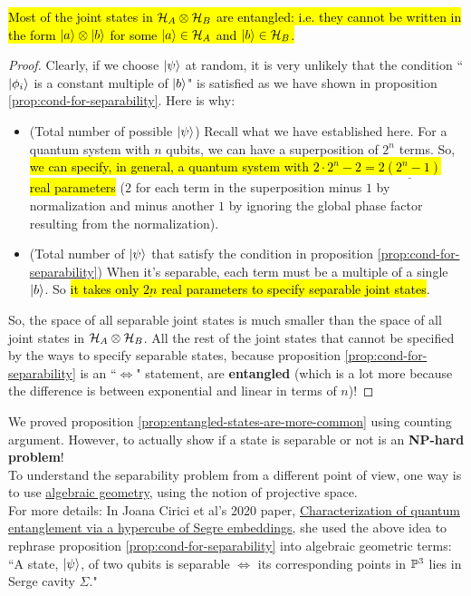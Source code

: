 \documentclass[12pt]{article}
\begin{document}
\begin{proposition}\label{prop:entangled-states-are-more-common}
\hl{Most of the joint states in $\HHH_A\otimes \HHH_B$ are entangled: i.e. they cannot be written in the form $\Ket{a}\otimes \Ket{b}$ for some $\Ket{a}\in \HHH_A$ and $\Ket{b}\in \HHH_B$. }
\end{proposition}
\begin{proof}
Clearly, if we choose $\Ket{\psi}$ at random, it is very unlikely that the condition ``$\Ket{\phi_i}$ is a constant multiple of $\Ket{b}$" is satisfied as we have shown in proposition \ref{prop:cond-for-separability}. Here is why:
\begin{itemize}
    \item (Total number of possible $\Ket{\psi}$) Recall what we have established here. For a quantum system with $n$ qubits, we can have a superposition of $2^n$ terms. So, \hl{we can specify, in general, a quantum system with $2\cdot 2^n - 2 = \underline{2(2^n - 1)}$ real parameters} ($2$ for each term in the superposition minus $1$ by normalization and minus another $1$ by ignoring the global phase factor resulting from the normalization).
    \item (Total number of $\Ket{\psi}$ that satisfy the condition in proposition \ref{prop:cond-for-separability}) When it's separable, each term must be a multiple of a single $\Ket{b}$. So \hl{it takes only $\underline{2n}$ real parameters to specify separable joint states}.
\end{itemize}

\noindent So, the space of all separable joint states is much smaller than the space of all joint states in $\HHH_A\otimes \HHH_B$. All the rest of the joint states that cannot be specified by the ways to specify separable states, because proposition \ref{prop:cond-for-separability} is an ``$\iff$" statement, are \textbf{entangled} (which is a lot more because the difference is between exponential and linear in terms of $n$)!
\end{proof}

\begin{remark}
We proved proposition \ref{prop:entangled-states-are-more-common} using counting argument. However, to actually show if a state is separable or not is an \textbf{NP-hard problem}!\\

\noindent To understand the separability problem from a different point of view, one way is to use \underline{algebraic geometry}, using the notion of projective space.\\

\noindent For more details: In Joana Cirici et al's 2020 paper, \href{https://arxiv.org/pdf/2008.09583.pdf}{Characterization of quantum entanglement via a hypercube of Segre embeddings}, she used the above idea to rephrase proposition \ref{prop:cond-for-separability} into algebraic geometric terms: ``A state, $\Ket{\psi}$, of two qubits is separable $\iff$ its corresponding points in $\PP^3$ lies in Serge cavity $\Sigma$."
\end{remark}
\end{document}
